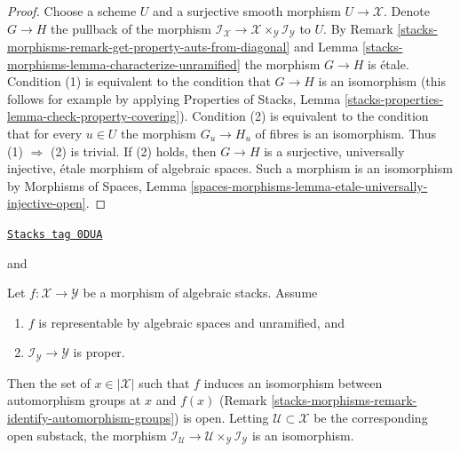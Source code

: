 \begin{proof}
Choose a scheme $U$ and a surjective smooth morphism $U \to \mathcal{X}$.
Denote $G \to H$ the pullback of the morphism
$\mathcal{I}_\mathcal{X} \to
\mathcal{X} \times_\mathcal{Y} \mathcal{I}_\mathcal{Y}$
to $U$. By Remark \ref{stacks-morphisms-remark-get-property-auts-from-diagonal} and
Lemma \ref{stacks-morphisms-lemma-characterize-unramified} the morphism $G \to H$ is \'etale.
Condition (1) is equivalent to the condition that
$G \to H$ is an isomorphism (this follows for example by applying
Properties of Stacks, Lemma
\ref{stacks-properties-lemma-check-property-covering}).
Condition (2) is equivalent to the condition that
for every $u \in U$ the morphism $G_u \to H_u$ of fibres
is an isomorphism. Thus (1) $\Rightarrow$ (2) is trivial.
If (2) holds, then $G \to H$ is a surjective, universally injective,
\'etale morphism of algebraic spaces. Such a morphism is an isomorphism by
Morphisms of Spaces, Lemma
\ref{spaces-morphisms-lemma-etale-universally-injective-open}.
\end{proof}

\begin{lemma}
\label{stacks-morphisms-lemma-stabilizer-preserving-unramified}
\href{https://stacks.math.columbia.edu/tag/0DUA}{\texttt{Stacks tag 0DUA}}

\begin{reference}
\cite[Proposition 3.5]{rydh_quotients} and
\cite[Proposition 2.5]{alper_quotient}
\end{reference}
Let $f : \mathcal{X} \to \mathcal{Y}$ be a morphism of algebraic stacks.
Assume
\begin{enumerate}
\item $f$ is representable by algebraic spaces and unramified, and
\item $\mathcal{I}_\mathcal{Y} \to \mathcal{Y}$ is proper.
\end{enumerate}
Then the set of $x \in |\mathcal{X}|$ such that $f$ induces an
isomorphism between automorphism groups at $x$ and $f(x)$
(Remark \ref{stacks-morphisms-remark-identify-automorphism-groups}) is open.
Letting $\mathcal{U} \subset \mathcal{X}$ be the corresponding open substack,
the morphism
$\mathcal{I}_\mathcal{U} \to
\mathcal{U} \times_\mathcal{Y} \mathcal{I}_\mathcal{Y}$
is an isomorphism.
\end{lemma}

